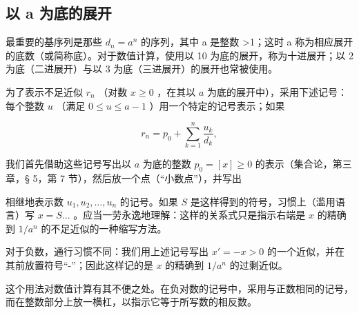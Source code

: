 \subsection{以 a 为底的展开}

最重要的基序列是那些 \(d_{n}=a^{n}\) 的序列，其中 a 是整数 \textgreater1；这时 a 称为相应展开的底数（或简称底）。对于数值计算，使用以 10 为底的展开，称为十进展开；以 2 为底（二进展开）与以 3 为底（三进展开）的展开也常被使用。

为了表示不足近似 \(r_n\) （对数 \(x \geqslant 0\) ，在其以 \(a\) 为底的展开中），采用下述记号：每个整数 \(u\) （满足 \(0 \leqslant u \leqslant a - 1\) ）用一个特定的记号表示；如果

\[
r _ {n} = p _ {0} + \sum_ {k = 1} ^ {n} \frac {u _ {k}}{d _ {k}},
\]

我们首先借助这些记号写出以 \(a\) 为底的整数 \(p_{0}=[x]\geqslant0\) 的表示（集合论，第三章，§ 5，第 7 节），然后放一个点（``小数点''），并写出

相继地表示数 \(u_1, u_2, \ldots, u_n\) 的记号。如果 \(S\) 是这样得到的符号，习惯上（滥用语言）写 \(x = S \ldots\) 。应当一劳永逸地理解：这样的关系式只是指示右端是 \(x\) 的精确到 \(1/a^n\) 的不足近似的一种缩写方法。

对于负数，通行习惯不同：我们用上述记号写出 \(x' = -x > 0\) 的一个近似，并在其前放置符号``-''；因此这样记的是 \(x\) 的精确到 \(1/a^n\) 的过剩近似。

这个用法对数值计算有其不便之处。在负对数的记号中，采用与正数相同的记号，而在整数部分上放一横杠，以指示它等于所写数的相反数。

